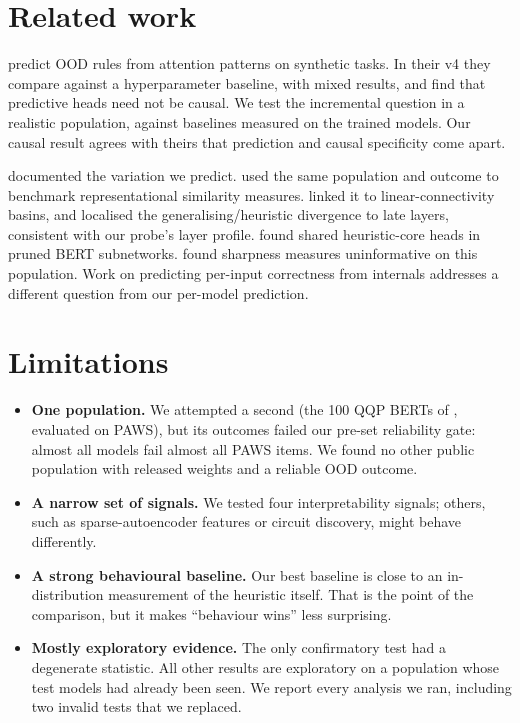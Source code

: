 \documentclass[10pt]{article}
\begin{document}
\section{Related work}
\citet{li2025} predict OOD rules from attention patterns on synthetic tasks. In their v4 they compare against a hyperparameter baseline, with mixed results, and find that predictive heads need not be causal. We test the incremental question in a realistic population, against baselines measured on the trained models. Our causal result agrees with theirs that prediction and causal specificity come apart.

\citet{mccoy2020} documented the variation we predict. \citet{ding2021} used the same population and outcome to benchmark representational similarity measures. \citet{juneja2023} linked it to linear-connectivity basins, and \citet{brown2023} localised the generalising/heuristic divergence to late layers, consistent with our probe's layer profile. \citet{bhaskar2024} found shared heuristic-core heads in pruned BERT subnetworks. \citet{andriushchenko2023} found sharpness measures uninformative on this population. Work on predicting per-input correctness from internals \citep{huang2025} addresses a different question from our per-model prediction.

\section{Limitations}
\begin{itemize}\itemsep0pt
\item \textbf{One population.} We attempted a second (the 100 QQP BERTs of \citet{juneja2023}, evaluated on PAWS), but its outcomes failed our pre-set reliability gate: almost all models fail almost all PAWS items. We found no other public population with released weights and a reliable OOD outcome.
\item \textbf{A narrow set of signals.} We tested four interpretability signals; others, such as sparse-autoencoder features or circuit discovery, might behave differently.
\item \textbf{A strong behavioural baseline.} Our best baseline is close to an in-distribution measurement of the heuristic itself. That is the point of the comparison, but it makes ``behaviour wins'' less surprising.
\item \textbf{Mostly exploratory evidence.} The only confirmatory test had a degenerate statistic. All other results are exploratory on a population whose test models had already been seen. We report every analysis we ran, including two invalid tests that we replaced.
\end{itemize}
\end{document}
